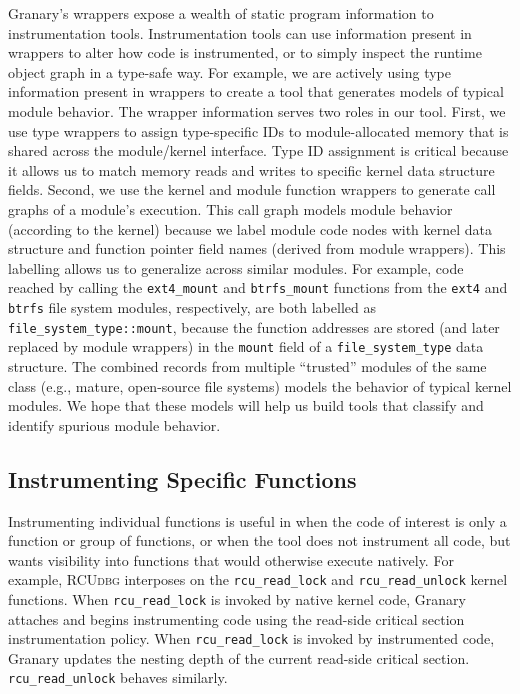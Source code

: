 \documentclass[preprint]{sigplanconf}
\newcommand{\toolname}[1]{{\scshape #1}}
\begin{document}
\label{sec:wrappers}

Granary's wrappers expose a wealth of static program information to instrumentation tools. Instrumentation tools can use information present in wrappers to alter how code is instrumented, or to simply inspect the runtime object graph in a type-safe way. For example, we are actively using type information present in wrappers to create a tool that generates models of typical module behavior. The wrapper information serves two roles in our tool. First, we use type wrappers to assign type-specific IDs to module-allocated memory that is shared across the module/kernel interface. Type ID assignment is critical because it allows us to match memory reads and writes to specific kernel data structure fields. Second, we use the kernel and module function wrappers to generate call graphs of a module's execution. This call graph models module behavior (according to the kernel) because we label module code nodes with kernel data structure and function pointer field names (derived from module wrappers). This labelling allows us to generalize across similar modules. For example, code reached by calling the \texttt{ext4\_mount} and \texttt{btrfs\_mount} functions from the \texttt{ext4} and \texttt{btrfs} file system modules, respectively, are both labelled as \texttt{file\_system\_type::mount}, because the function addresses are stored (and later replaced by module wrappers) in the \texttt{mount} field of a \texttt{file\_system\_type} data structure. The combined records from multiple ``trusted'' modules of the same class (e.g., mature, open-source file systems) models the behavior of typical kernel modules. We hope that these models will help us build tools that classify and identify spurious module behavior. 

\subsection{Instrumenting Specific Functions}\label{sec:function_wrapper}

Instrumenting individual functions is useful in when the code of interest is only a function or group of functions, or when the tool does not instrument all code, but wants visibility into functions that would otherwise execute natively. For example, \toolname{RCUdbg} interposes on the \texttt{rcu\_\linebreak[0]read\_\linebreak[0]lock} and \texttt{rcu\_\linebreak[0]read\_\linebreak[0]unlock} kernel functions. When \texttt{rcu\_\linebreak[0]read\_\linebreak[0]lock} is invoked by native kernel code, Granary attaches and begins instrumenting code using the read-side critical section instrumentation policy. When \texttt{rcu\_\linebreak[0]read\_\linebreak[0]lock} is invoked by instrumented code, Granary updates the nesting depth of the current read-side critical section. \texttt{rcu\_\linebreak[0]read\_\linebreak[0]unlock} behaves similarly.
\end{document}
